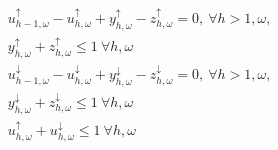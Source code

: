 \documentclass[11pt,a4paper]{article}
\begin{document}
\begin{subequations}
\begin{align}
        \  & u_{h-1,\omega}^{\uparrow} - u_{h,\omega}^{\uparrow} + y_{h,\omega}^{\uparrow} - z_{h,\omega}^{\uparrow} = 0, \    \forall{h>1,\omega},                                                                                                         \label{aux:1}                                                                                                                                                                                                                                                                                         \\
        \  & y_{h,\omega}^{\uparrow} + z_{h,\omega}^{\uparrow} \leq 1 \                                                             \forall{h,\omega}                                                                                                                                                                     \label{aux:2}                                                                                                                                                                                                                           \\
        \  & u_{h-1,\omega}^{\downarrow} - u_{h,\omega}^{\downarrow} + y_{h,\omega}^{\downarrow} - z_{h,\omega}^{\downarrow} = 0, \                                                                                                                                                                                                                                                    \forall{h>1, \omega},                                                                                                                                        \label{aux:3} \\
        \  & y_{h,\omega}^{\downarrow} + z_{h,\omega}^{\downarrow} \leq 1 \                                                         \forall{h,\omega}                                                                                                                                                                     \label{aux:4}                                                                                                                                                                                                                           \\
        \  & u_{h,\omega}^{\uparrow} + u_{h,\omega}^{\downarrow} \leq 1 \                                                           \forall{h,\omega}                                                                                                                                                                     \label{aux:5}                                                                                                                                                                                                                           \\

\end{align}
\end{subequations}
\end{document}
